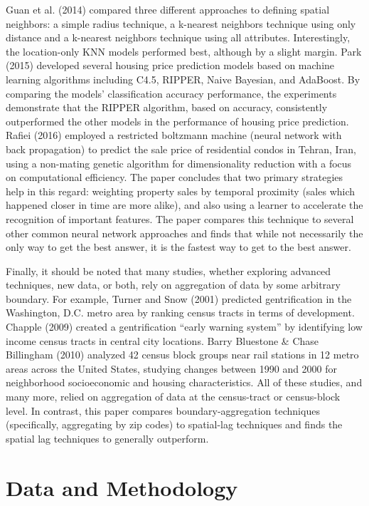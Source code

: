 \documentclass[12pt,]{article}
\begin{document}
Guan et al. (2014) compared three different approaches to defining
spatial neighbors: a simple radius technique, a k-nearest neighbors
technique using only distance and a k-nearest neighbors technique using
all attributes. Interestingly, the location-only KNN models performed
best, although by a slight margin. Park (2015) developed several housing
price prediction models based on machine learning algorithms including
C4.5, RIPPER, Naive Bayesian, and AdaBoost. By comparing the models'
classification accuracy performance, the experiments demonstrate that
the RIPPER algorithm, based on accuracy, consistently outperformed the
other models in the performance of housing price prediction. Rafiei
(2016) employed a restricted boltzmann machine (neural network with back
propagation) to predict the sale price of residential condos in Tehran,
Iran, using a non-mating genetic algorithm for dimensionality reduction
with a focus on computational efficiency. The paper concludes that two
primary strategies help in this regard: weighting property sales by
temporal proximity (sales which happened closer in time are more alike),
and also using a learner to accelerate the recognition of important
features. The paper compares this technique to several other common
neural network approaches and finds that while not necessarily the only
way to get the best answer, it is the fastest way to get to the best
answer.

Finally, it should be noted that many studies, whether exploring
advanced techniques, new data, or both, rely on aggregation of data by
some arbitrary boundary. For example, Turner and Snow (2001) predicted
gentrification in the Washington, D.C. metro area by ranking census
tracts in terms of development. Chapple (2009) created a gentrification
``early warning system'' by identifying low income census tracts in
central city locations. Barry Bluestone \& Chase Billingham (2010)
analyzed 42 census block groups near rail stations in 12 metro areas
across the United States, studying changes between 1990 and 2000 for
neighborhood socioeconomic and housing characteristics. All of these
studies, and many more, relied on aggregation of data at the
census-tract or census-block level. In contrast, this paper compares
boundary-aggregation techniques (specifically, aggregating by zip codes)
to spatial-lag techniques and finds the spatial lag techniques to
generally outperform.

\hypertarget{data-and-methodology}{%
\section{Data and Methodology}\label{data-and-methodology}}
\end{document}
